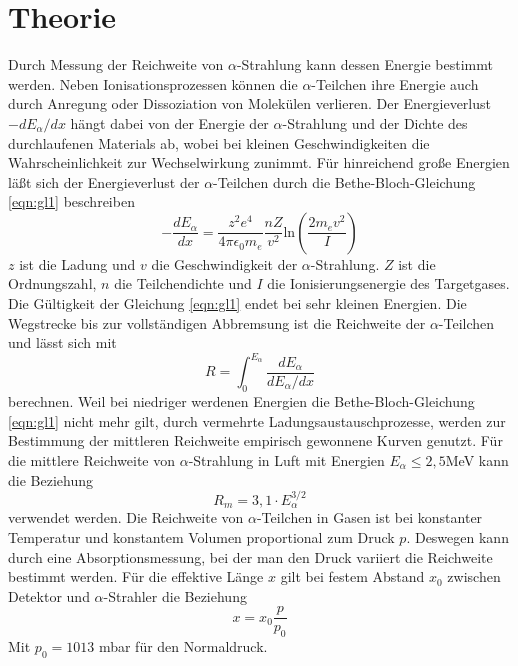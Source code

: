 \section{Theorie}
\label{sec:Theorie}

Durch Messung der Reichweite von $\alpha$-Strahlung kann dessen Energie bestimmt werden.
Neben Ionisationsprozessen können die $\alpha$-Teilchen ihre Energie auch durch Anregung oder Dissoziation von Molekülen verlieren.
Der Energieverlust $-dE_{\alpha}/dx$ hängt dabei von der Energie der $\alpha$-Strahlung und der Dichte des durchlaufenen Materials ab,
wobei bei kleinen Geschwindigkeiten die Wahrscheinlichkeit zur Wechselwirkung zunimmt.
Für hinreichend große Energien läßt sich der Energieverlust der $\alpha$-Teilchen durch die Bethe-Bloch-Gleichung \ref{eqn:gl1} beschreiben
\begin{equation}
    -\frac{dE_{\alpha}}{dx} = \frac{z^2 e^4}{4 \pi \epsilon_0 m_e} \frac{n Z}{v^2} \text{ln} \left(\frac{2 m_e v^2}{I}\right)
    \label{eqn:gl1}
\end{equation}
$z$ ist die Ladung und $v$ die Geschwindigkeit der $\alpha$-Strahlung.
$Z$ ist die Ordnungszahl, $n$ die Teilchendichte und $I$ die Ionisierungsenergie des Targetgases.
Die Gültigkeit der Gleichung \ref{eqn:gl1} endet bei sehr kleinen Energien.
Die Wegstrecke bis zur vollständigen Abbremsung ist die Reichweite der $\alpha$-Teilchen und lässt sich mit
\begin{equation}
    R = \int_0^{E_{\alpha}} \frac{dE_{\alpha}}{dE_{\alpha}/dx}
    \label{eqn:gl2}
\end{equation}
berechnen.
Weil bei niedriger werdenen Energien die Bethe-Bloch-Gleichung \ref{eqn:gl1} nicht mehr gilt, durch vermehrte Ladungsaustauschprozesse,
werden zur Bestimmung der mittleren Reichweite empirisch gewonnene Kurven genutzt.
Für die mittlere Reichweite von $\alpha$-Strahlung in Luft mit Energien $E_{\alpha} \leq 2,5$MeV kann die Beziehung
\begin{equation}
    R_m = 3,1 \cdot E_{\alpha}^{3/2}
    \label{eqn:gl3}
\end{equation}
verwendet werden.
Die Reichweite von $\alpha$-Teilchen in Gasen ist bei konstanter Temperatur und konstantem Volumen proportional zum Druck $p$.
Deswegen kann durch eine Absorptionsmessung, bei der man den Druck variiert die Reichweite bestimmt werden.
Für die effektive Länge $x$ gilt bei festem Abstand $x_0$ zwischen Detektor und $\alpha$-Strahler die Beziehung
\begin{equation}
    x = x_0 \frac{p}{p_0}
    \label{eqn:gl4}
\end{equation}
Mit $p_0 = 1013$ mbar für den Normaldruck.
